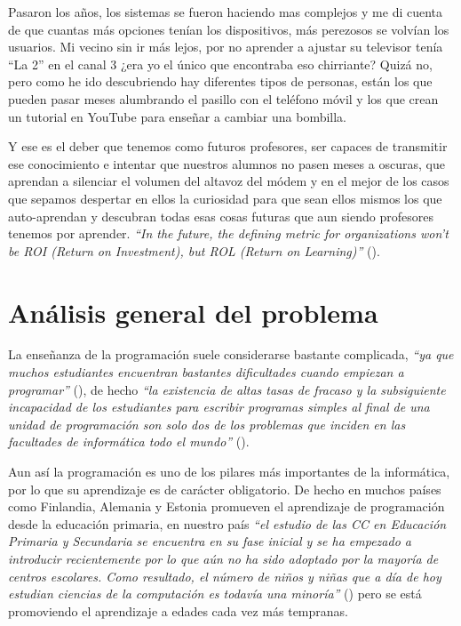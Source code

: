 \bigskip
Pasaron los años, los sistemas se fueron haciendo mas complejos y me di cuenta de que cuantas más opciones tenían los dispositivos, más perezosos se volvían los usuarios. Mi vecino sin ir más lejos, por no aprender a ajustar su televisor tenía ``La 2'' en el canal 3 ¿era yo el único que encontraba eso chirriante? Quizá no, pero como he ido descubriendo hay diferentes tipos de personas, están los que pueden pasar meses alumbrando el pasillo con el teléfono móvil y los que crean un tutorial en YouTube para enseñar a cambiar una bombilla.

\bigskip
Y ese es el deber que tenemos como futuros profesores, ser capaces de transmitir ese conocimiento e intentar que nuestros alumnos no pasen meses a oscuras, que aprendan a silenciar el volumen del altavoz del módem y en el mejor de los casos que sepamos despertar en ellos la curiosidad para que sean ellos mismos los que auto-aprendan y descubran todas esas cosas futuras que aun siendo profesores tenemos por aprender. \textit{``In the future, the defining metric for organizations won’t be ROI (Return on Investment), but ROL (Return on Learning)''} (\cite{ismail_exponential_2014}).

\section{Análisis general del problema}

La enseñanza de la programación suele considerarse bastante complicada, \textit{``ya que muchos estudiantes encuentran bastantes dificultades cuando empiezan a programar''} (\cite{rubio_uso_2018}), de hecho \textit{``la existencia de altas tasas de fracaso y la subsiguiente incapacidad de los estudiantes para escribir programas simples al final de una unidad de programación son solo dos de los problemas que inciden en las facultades de informática todo el mundo''} (\cite{bruce_contemporary_2002}).

\bigskip
Aun así la programación es uno de los pilares más importantes de la informática, por lo que su aprendizaje es de carácter obligatorio. De hecho en muchos países como Finlandia, Alemania y Estonia promueven el aprendizaje de programación desde la educación primaria, en nuestro país \textit{``el estudio de las CC en Educación Primaria y Secundaria se encuentra en su fase inicial y se ha empezado a introducir recientemente por lo que aún no ha sido adoptado por la mayoría de centros escolares. Como resultado, el número de niños y niñas que a día de hoy estudian ciencias de la computación es todavía una minoría''} (\cite{fecyt_educacion_2016}) pero se está promoviendo el aprendizaje a edades cada vez más tempranas.

